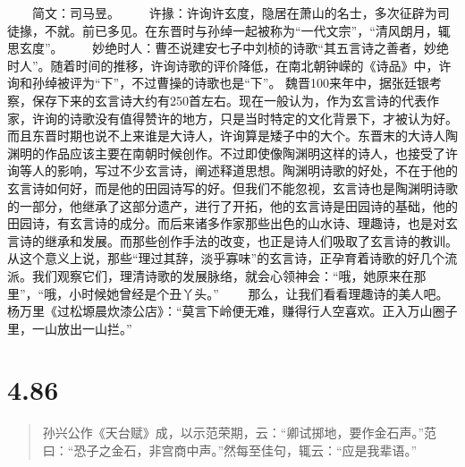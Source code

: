 \documentclass[]{book}
\begin{document}
　　简文：司马昱。
　　许掾：许询许玄度，隐居在萧山的名士，多次征辟为司徒掾，不就。前已多见。在东晋时与孙绰一起被称为``一代文宗''，``清风朗月，辄思玄度''。
　　妙绝时人：曹丕说建安七子中刘桢的诗歌``其五言诗之善者，妙绝时人''。随着时间的推移，许询诗歌的评价降低，在南北朝钟嵘的《诗品》中，许询和孙绰被评为``下''，不过曹操的诗歌也是``下''。
魏晋100来年中，据张廷银考察，保存下来的玄言诗大约有250首左右。现在一般认为，作为玄言诗的代表作家，许询的诗歌没有值得赞许的地方，只是当时特定的文化背景下，才被认为好。而且东晋时期也说不上来谁是大诗人，许询算是矮子中的大个。东晋末的大诗人陶渊明的作品应该主要在南朝时候创作。不过即使像陶渊明这样的诗人，也接受了许询等人的影响，写过不少玄言诗，阐述释道思想。陶渊明诗歌的好处，不在于他的玄言诗如何好，而是他的田园诗写的好。但我们不能忽视，玄言诗也是陶渊明诗歌的一部分，他继承了这部分遗产，进行了开拓，他的玄言诗是田园诗的基础，他的田园诗，有玄言诗的成分。而后来诸多作家那些出色的山水诗、理趣诗，也是对玄言诗的继承和发展。而那些创作手法的改变，也正是诗人们吸取了玄言诗的教训。从这个意义上说，那些``理过其辞，淡乎寡味''的玄言诗，正孕育着诗歌的好几个流派。我们观察它们，理清诗歌的发展脉络，就会心领神会：``哦，她原来在那里''，``哦，小时候她曾经是个丑丫头。''
　　那么，让我们看看理趣诗的美人吧。杨万里《过松塬晨炊漆公店》：``莫言下岭便无难，赚得行人空喜欢。正入万山圈子里，一山放出一山拦。''

\section{4.86}\label{section-263}

\begin{quote}
孙兴公作《天台赋》成，以示范荣期，云：``卿试掷地，要作金石声。''范曰：``恐子之金石，非宫商中声。''然每至佳句，辄云：``应是我辈语。''
\end{quote}
\end{document}
